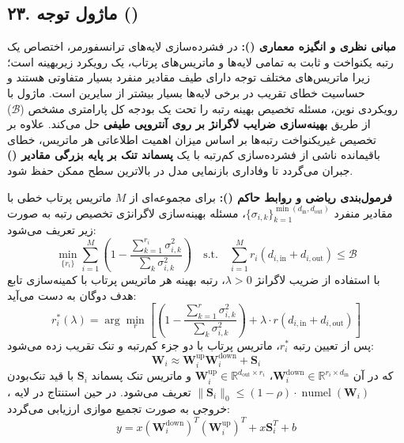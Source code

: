 \subsection*{۲۳. ماژول توجه  ()}

\textbf{مبانی نظری و انگیزه معماری ():}
در فشرده‌سازی لایه‌های ترانسفورمر، اختصاص یک رتبه یکنواخت و ثابت به تمامی لایه‌ها و ماتریس‌های پرتاب، یک رویکرد زیربهینه است؛ زیرا ماتریس‌های مختلف توجه دارای طیف مقادیر منفرد بسیار متفاوتی هستند و حساسیت خطای تقریب در برخی لایه‌ها بسیار بیشتر از سایرین است.
ماژول  با رویکردی نوین، مسئله تخصیص بهینه رتبه را تحت یک بودجه کل پارامتری مشخص ($\mathcal{B}$) از طریق \textbf{بهینه‌سازی ضرایب لاگرانژ بر روی آنتروپی طیفی} حل می‌کند. علاوه بر تخصیص غیریکنواخت رتبه‌ها بر اساس میزان اهمیت اطلاعاتی هر ماتریس، خطای باقیمانده ناشی از فشرده‌سازی کم‌رتبه با یک \textbf{پسماند تنک بر پایه بزرگی مقادیر ()} جبران می‌گردد تا وفاداری بازنمایی مدل در بالاترین سطح ممکن حفظ شود.

\textbf{فرمول‌بندی ریاضی و روابط حاکم ():}
برای مجموعه‌ای از $M$ ماتریس پرتاب خطی با مقادیر منفرد $\{\sigma_{i, k}\}_{k=1}^{\min(d_{\text{in}}, d_{\text{out}})}$، مسئله بهینه‌سازی لاگرانژی تخصیص رتبه به صورت زیر تعریف می‌شود:
\begin{equation}
\min_{\{r_i\}} \sum_{i=1}^{M} \left( 1 - \frac{\sum_{k=1}^{r_i} \sigma_{i, k}^2}{\sum_k \sigma_{i, k}^2} \right) \quad \text{s.t.} \quad \sum_{i=1}^M r_i (d_{i, \text{in}} + d_{i, \text{out}}) \le \mathcal{B}
\end{equation}
با استفاده از ضریب لاگرانژ $\lambda > 0$، رتبه بهینه هر ماتریس پرتاب با کمینه‌سازی تابع هدف دوگان به دست می‌آید:
\begin{equation}
r_i^*(\lambda) = \arg\min_r \left[ \left(1 - \frac{\sum_{k=1}^r \sigma_{i, k}^2}{\sum_k \sigma_{i, k}^2}\right) + \lambda \cdot r (d_{i, \text{in}} + d_{i, \text{out}}) \right]
\end{equation}
پس از تعیین رتبه $r_i^*$، ماتریس پرتاب با دو جزء کم‌رتبه و تنک تقریب زده می‌شود:
\begin{equation}
\mathbf{W}_i \approx \mathbf{W}_i^{\text{up}} \mathbf{W}_i^{\text{down}} + \mathbf{S}_i
\end{equation}
که در آن $\mathbf{W}_i^{\text{down}} \in \mathbb{R}^{r_i \times d_{\text{in}}}$، $\mathbf{W}_i^{\text{up}} \in \mathbb{R}^{d_{\text{out}} \times r_i}$ و ماتریس تنک پسماند $\mathbf{S}_i$ با قید تنک‌بودن $\| \mathbf{S}_i \|_0 \le (1 - \rho) \cdot \operatorname{numel}(\mathbf{W}_i)$ تعریف می‌شود.
در حین استنتاج در لایه ، خروجی به صورت تجمیع موازی ارزیابی می‌گردد:
\begin{equation}
y = x (\mathbf{W}_i^{\text{down}})^T (\mathbf{W}_i^{\text{up}})^T + x \mathbf{S}_i^T + b
\end{equation}

